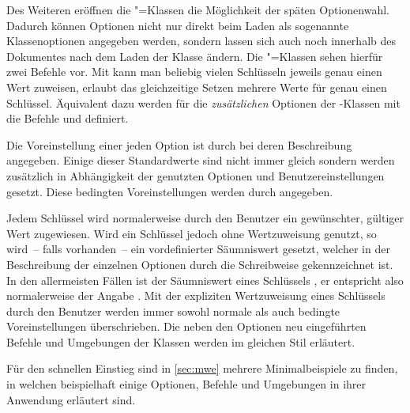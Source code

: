 \documentclass[%
  english,ngerman,%
  headings=optiontoheadandtoc,captions=tableheading,numbers=noenddot,%
  chapterpage,cdfoot,%
]{tudscrman}
\begin{document}
Des Weiteren eröffnen die \KOMAScript"=Klassen die Möglichkeit der späten 
Optionenwahl. Dadurch können Optionen nicht nur direkt beim Laden als sogenannte 
Klassenoptionen angegeben werden, sondern lassen sich auch noch innerhalb des 
Dokumentes nach dem Laden der Klasse ändern. Die \KOMAScript"=Klassen sehen 
hierfür zwei Befehle vor. Mit 
kann man beliebig vielen Schlüsseln jeweils genau einen Wert zuweisen, 
 erlaubt das 
gleichzeitige Setzen mehrere Werte für genau einen Schlüssel. Äquivalent 
dazu werden für die \emph{zusätzlichen} Optionen der \TUDScript-Klassen mit 
die Befehle  und 
 definiert.

Die Voreinstellung einer jeden Option ist durch 
bei deren Beschreibung angegeben. Einige dieser Standardwerte sind nicht 
immer gleich sondern werden zusätzlich in Abhängigkeit der genutzten Optionen und
Benutzereinstellungen gesetzt. Diese bedingten Voreinstellungen werden durch
\PValue{\,|\,}\PValue{:\,}%
 angegeben.

Jedem Schlüssel wird normalerweise durch den Benutzer ein gewünschter, gültiger 
Wert zugewiesen. Wird ein Schlüssel jedoch ohne Wertzuweisung genutzt, so 
wird~-- falls vorhanden~-- ein vordefinierter Säumniswert gesetzt, welcher in 
der Beschreibung der einzelnen Optionen durch die  
Schreibweise gekennzeichnet ist. In den allermeisten Fällen ist der Säumniswert
eines Schlüssels , er entspricht also normalerweise der Angabe 
. Mit der expliziten Wertzuweisung 
eines Schlüssels durch den Benutzer werden immer sowohl normale als auch 
bedingte Voreinstellungen überschrieben. Die neben den Optionen neu 
eingeführten Befehle und Umgebungen der Klassen werden im gleichen Stil 
erläutert.

Für den schnellen Einstieg sind in \autoref{sec:mwe} mehrere Minimalbeispiele zu 
finden, in welchen beispielhaft einige Optionen, Befehle und Umgebungen in ihrer 
Anwendung erläutert sind.
\end{document}
